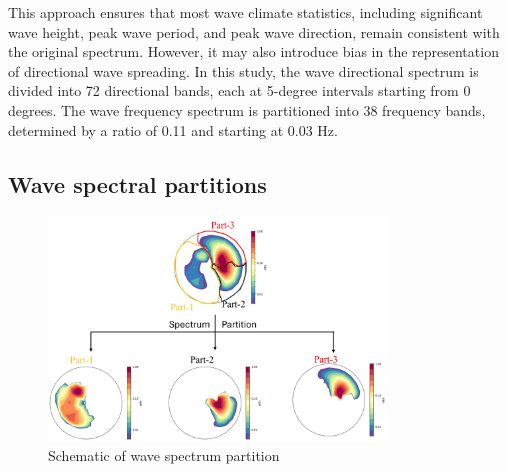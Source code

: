 This approach ensures that most wave climate statistics, including significant
wave height, peak wave period, and peak wave direction, remain consistent with
the original spectrum. However, it may also introduce bias in the representation
of directional wave spreading. In this study, the wave directional spectrum is
divided into 72 directional bands, each at 5-degree intervals starting from 0
degrees. The wave frequency spectrum is partitioned into 38 frequency bands,
determined by a ratio of 0.11 and starting at 0.03 Hz.

\subsection{Wave spectral partitions}
\label{Wave spectral partitions}

\begin{figure}[htbp]
  \centering
  \includegraphics[width=0.8\textwidth]{chapter4/resources/figure4-3.jpg}
  \caption{Schematic of wave spectrum partition}
  \label{fig:fig4.3}
\end{figure}

